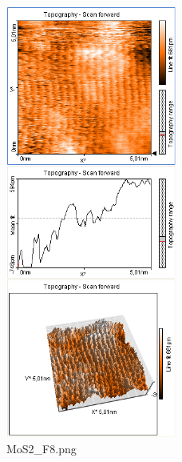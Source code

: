 \begin{figure}[H]
	\centering \includegraphics*[viewport= 5 528 322 825 , width = 0.5\textwidth]{messwerte/Freitag/MoS2_F8.png}
	\caption{MoS2\_F8.png}
	\end{figure}